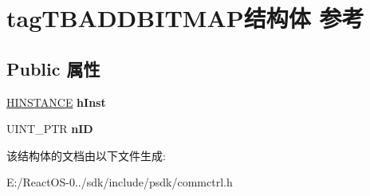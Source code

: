 \hypertarget{structtag_t_b_a_d_d_b_i_t_m_a_p}{}\section{tag\+T\+B\+A\+D\+D\+B\+I\+T\+M\+A\+P结构体 参考}
\label{structtag_t_b_a_d_d_b_i_t_m_a_p}
\subsection*{Public 属性}
\begin{DoxyCompactItemize}
\item 
\mbox{\label{structtag_t_b_a_d_d_b_i_t_m_a_p_ad56576e0a2804d0628748836847e2a17}} 
\hyperlink{interfacevoid}{H\+I\+N\+S\+T\+A\+N\+CE} {\bfseries h\+Inst}
\item 
\mbox{\label{structtag_t_b_a_d_d_b_i_t_m_a_p_ab1a320bcb4697dec72c8194bf003e2ed}} 
U\+I\+N\+T\+\_\+\+P\+TR {\bfseries n\+ID}
\end{DoxyCompactItemize}


该结构体的文档由以下文件生成\+:\begin{DoxyCompactItemize}
\item 
E\+:/\+React\+O\+S-\/0../sdk/include/psdk/commctrl.\+h\end{DoxyCompactItemize}
